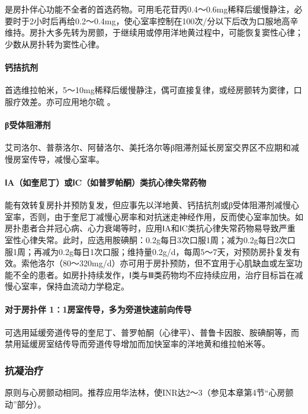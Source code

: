 是房扑伴心功能不全者的首选药物。可用毛花苷丙0.4～0.6mg稀释后缓慢静注，必要时于2小时后再给0.2～0.4mg，使心室率控制在100次/分以下后改为口服地高辛维持。房扑大多先转为房颤，于继续用或停用洋地黄过程中，可能恢复窦性心律；少数从房扑转为窦性心律。

\paragraph{钙拮抗剂}

首选维拉帕米，5～10mg稀释后缓慢静注，偶可直接复律，或经房颤转为窦律，口服疗效差。亦可应用地尔硫{}
。

\paragraph{β受体阻滞剂}

艾司洛尔、普萘洛尔、阿替洛尔、美托洛尔等β阻滞剂延长房室交界区不应期和减慢房室传导，减慢心室率。

\paragraph{ⅠA（如奎尼丁）或ⅠC（如普罗帕酮）类抗心律失常药物}

能有效转复房扑并预防复发，但应事先以洋地黄、钙拮抗剂或β受体阻滞剂减慢心室率，否则，由于奎尼丁减慢心房率和对抗迷走神经作用，反而使心室率加快。如房扑患者合并冠心病、心力衰竭等时，应用ⅠA和ⅠC类抗心律失常药物易导致严重室性心律失常。此时，应选用胺碘酮：0.2g每日3次口服1周；减为0.2g每日2次口服1周；再减为0.2g每日1次口服；维持量0.2g/d，每周5～7天，对预防房扑复发有效。索他洛尔（80～320mg/d）亦可用于房扑预防，但不宜用于心肌缺血或左室功能不全的患者。如房扑持续发作，Ⅰ类与Ⅲ类药物均不应持续应用，治疗目标旨在减慢心室率，保持血流动力学稳定。

\paragraph{对于房扑伴 1∶1房室传导，多为旁道快速前向传导}

可选用延缓旁道传导的奎尼丁、普罗帕酮（心律平）、普鲁卡因胺、胺碘酮等，而禁用延缓房室结传导而旁道传导增加而加快室率的洋地黄和维拉帕米等。

\subsubsection{抗凝治疗}

原则与心房颤动相同。推荐应用华法林，使INR达2～3（参见本章第4节“心房颤动”部分）。

